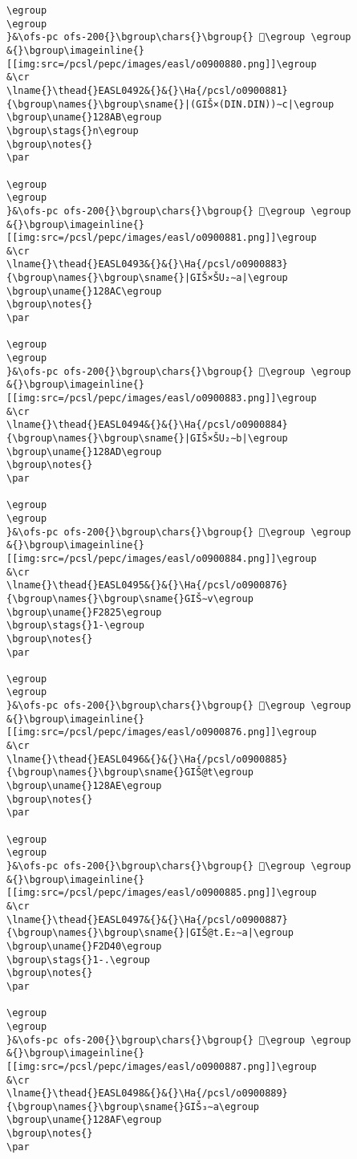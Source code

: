 \begin{verbatim}
\egroup
\egroup
}&\ofs-pc ofs-200{}\bgroup\chars{}\bgroup{} 𒢪\egroup \egroup
&{}\bgroup\imageinline{}[[img:src=/pcsl/pepc/images/easl/o0900880.png]]\egroup
&\cr
\lname{}\thead{}EASL0492&{}&{}\Ha{/pcsl/o0900881}{\bgroup\names{}\bgroup\sname{}|(GIŠ×(DIN.DIN))∼c|\egroup
\bgroup\uname{}128AB\egroup
\bgroup\stags{}n\egroup
\bgroup\notes{}
\par 

\egroup
\egroup
}&\ofs-pc ofs-200{}\bgroup\chars{}\bgroup{} 𒢫\egroup \egroup
&{}\bgroup\imageinline{}[[img:src=/pcsl/pepc/images/easl/o0900881.png]]\egroup
&\cr
\lname{}\thead{}EASL0493&{}&{}\Ha{/pcsl/o0900883}{\bgroup\names{}\bgroup\sname{}|GIŠ×ŠU₂∼a|\egroup
\bgroup\uname{}128AC\egroup
\bgroup\notes{}
\par 

\egroup
\egroup
}&\ofs-pc ofs-200{}\bgroup\chars{}\bgroup{} 𒢬\egroup \egroup
&{}\bgroup\imageinline{}[[img:src=/pcsl/pepc/images/easl/o0900883.png]]\egroup
&\cr
\lname{}\thead{}EASL0494&{}&{}\Ha{/pcsl/o0900884}{\bgroup\names{}\bgroup\sname{}|GIŠ×ŠU₂∼b|\egroup
\bgroup\uname{}128AD\egroup
\bgroup\notes{}
\par 

\egroup
\egroup
}&\ofs-pc ofs-200{}\bgroup\chars{}\bgroup{} 𒢭\egroup \egroup
&{}\bgroup\imageinline{}[[img:src=/pcsl/pepc/images/easl/o0900884.png]]\egroup
&\cr
\lname{}\thead{}EASL0495&{}&{}\Ha{/pcsl/o0900876}{\bgroup\names{}\bgroup\sname{}GIŠ∼v\egroup
\bgroup\uname{}F2825\egroup
\bgroup\stags{}1-\egroup
\bgroup\notes{}
\par 

\egroup
\egroup
}&\ofs-pc ofs-200{}\bgroup\chars{}\bgroup{} 󲠥\egroup \egroup
&{}\bgroup\imageinline{}[[img:src=/pcsl/pepc/images/easl/o0900876.png]]\egroup
&\cr
\lname{}\thead{}EASL0496&{}&{}\Ha{/pcsl/o0900885}{\bgroup\names{}\bgroup\sname{}GIŠ@t\egroup
\bgroup\uname{}128AE\egroup
\bgroup\notes{}
\par 

\egroup
\egroup
}&\ofs-pc ofs-200{}\bgroup\chars{}\bgroup{} 𒢮\egroup \egroup
&{}\bgroup\imageinline{}[[img:src=/pcsl/pepc/images/easl/o0900885.png]]\egroup
&\cr
\lname{}\thead{}EASL0497&{}&{}\Ha{/pcsl/o0900887}{\bgroup\names{}\bgroup\sname{}|GIŠ@t.E₂∼a|\egroup
\bgroup\uname{}F2D40\egroup
\bgroup\stags{}1-.\egroup
\bgroup\notes{}
\par 

\egroup
\egroup
}&\ofs-pc ofs-200{}\bgroup\chars{}\bgroup{} 󲵀\egroup \egroup
&{}\bgroup\imageinline{}[[img:src=/pcsl/pepc/images/easl/o0900887.png]]\egroup
&\cr
\lname{}\thead{}EASL0498&{}&{}\Ha{/pcsl/o0900889}{\bgroup\names{}\bgroup\sname{}GIŠ₃∼a\egroup
\bgroup\uname{}128AF\egroup
\bgroup\notes{}
\par 


\end{verbatim}
